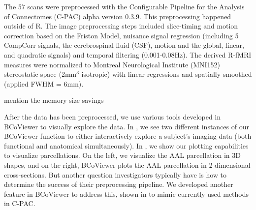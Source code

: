 \documentclass{nature}
\begin{document}
The 57 scans were preprocessed with the Configurable Pipeline for the Analysis
of Connectomes (C-PAC) alpha version 0.3.9. This preprocessing 
happened outside of R. The image preprocessing steps
included slice-timing and motion correction based on the Friston Model, nuisance
signal
regression (including 5 CompCorr signals, the cerebrospinal fluid (CSF), motion
 and the global, linear, and quadratic
signals) and temporal filtering (0.001-0.08Hz). The derived R-fMRI measures
were normalized to Montreal Neurological Institute (MNI152) stereostatic
space (2mm$^3$ isotropic) with linear regressions and spatially smoothed
(applied FWHM = 6mm). 


{\color{red}mention the memory size savings}

After the data has been preprocessed, we use various tools developed in
BCoViewer
to visually explore the data. In , we see two different
instances
of our BCoViewer function to either interactively explore a subject's imaging
data (both
functional and anatomical simultaneously). 
In , we show our plotting capabilities to visualize parcellations.
On the left, we visualize the AAL parcellation in 3D shapes, and on the right, BCoViewer plots the AAL
parcellation in 2-dimensional cross-sections. But another question investigators typically
have is 
how to determine the success of their preprocessing pipeline. We developed
another feature
in BCoViewer to address this, shown in  to mimic
currently-used methods
in C-PAC.
\end{document}
